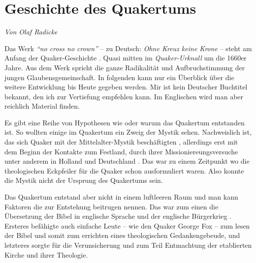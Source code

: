 




\chapter{Geschichte des Quakertums}\label{ref:entwiklung_quakertum}


\begin{flushright}
\begin{footnotesize}
\textit{Von Olaf Radicke}
\end{footnotesize}
\end{flushright}
\smallskip 

Das Werk \textit{"`no cross no crown"'} -- zu Deutsch: \textit{Ohne Kreuz keine Krone} --
steht am Anfang der Quaker-Geschichte . Quasi mitten im \textit{Quaker-Urknall}
um die 1660er Jahre. Aus dem Werk spricht die ganze Radikalität und
Aufbruchstimmung der jungen Glaubensgemeinschaft. In folgenden kann nur ein
Überblick über die weitere Entwicklung bis Heute gegeben werden. Mir ist kein
Deutscher Buchtitel bekannt, den ich zur Vertiefung empfehlen kann. Im
Englischen wird man aber reichlich Material finden.

\medskip

Es gibt eine Reihe von Hypothesen wie oder warum das Quakertum entstanden ist.
So
wollten einige im Quakertum ein Zweig der Mystik  sehen. Nachweislich ist, das
sich Quaker mit der Mittelalter-Mystik beschäftigten , allerdings erst mit dem
Beginn der Kontakte zum Festland, durch ihrer Missioniereungsversuche  unter
anderem in Holland  und Deutschland . Das war zu einem Zeitpunkt wo die
theologischen Eckpfeiler für die Quaker schon ausformuliert waren. Also konnte
die Mystik nicht der Ursprung des Quakertums sein.

\medskip

Das Quakertum entstand aber nicht in einem luftleeren Raum und man kann Faktoren
die zur Entstehung beitrugen nennen. Das war zum einen die Übersetzung der Bibel 
in englische Sprache und der englische Bürgerkrieg . Ersteres befähigte auch
einfache Leute -- wie den Quaker George Fox  -- zum lesen der Bibel und somit zum
errichten eines theologischen Gedankengebeude, und letzteres sorgte für die
Verunsicherung und zum Teil Entmachtung der etablierten Kirche  und ihrer
Theologie.

